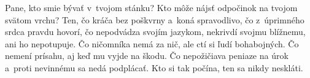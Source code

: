 Pane, kto smie bývať v~tvojom stánku?
Kto môže nájsť odpočinok na tvojom svätom vrchu?
\versseparator
Ten, čo kráča bez poškvrny a~koná spravodlivo,
\versseparator
čo z~úprimného srdca pravdu hovorí,
čo nepodvádza svojím jazykom,
\versseparator
nekrivdí svojmu blížnemu,
ani ho nepotupuje.
\versseparator
Čo ničomníka nemá za nič,
ale ctí si ľudí bohabojných.
\versseparator
Čo nemení prísahu, aj keď mu vyjde na škodu.
Čo nepožičiava peniaze na úrok
a~proti nevinnému sa nedá podplácať.
\versseparator
Kto si tak počína, ten sa nikdy neskláti. 
